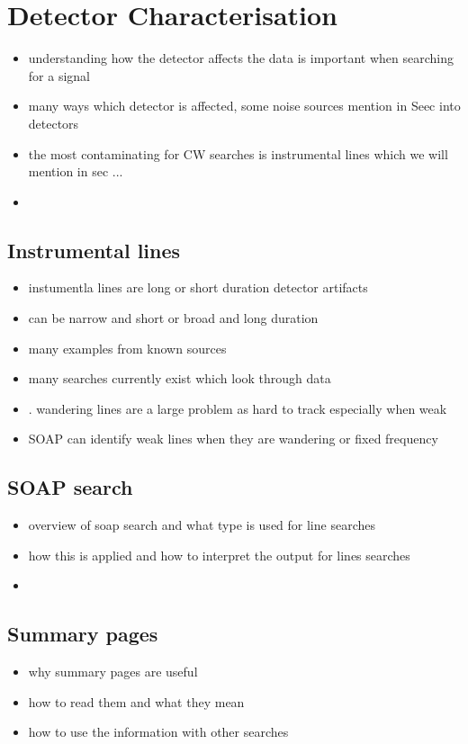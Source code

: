 \chapter{Detector Characterisation}


\begin{itemize}
    \item understanding how the detector affects the data is important when searching for a signal
    \item many ways which detector is affected, some noise sources mention in Seec into detectors
    \item the most contaminating for CW searches is instrumental lines which we will mention in sec ...
    \item 
    
\end{itemize}

\section{Instrumental lines}
\begin{itemize}
    \item instumentla lines are long or short duration detector artifacts
    \item can be narrow and short or broad and long duration
    \item many examples from known sources
    \item many searches currently exist which look through data
    \item . wandering lines are a large problem as hard to track especially when weak
    \item SOAP can identify weak lines when they are wandering or fixed frequency
\end{itemize}

\section{SOAP search}
\begin{itemize}
    \item overview of soap search and what type is used for line searches
    \item how this is applied and how to interpret the output for lines searches
    \item 
\end{itemize}


\section{Summary pages}
\begin{itemize}
    \item why summary pages are useful 
    \item how to read them and what they mean
    \item how to use the information with other searches
\end{itemize}
